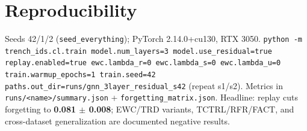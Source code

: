 \documentclass[10pt,a4paper,twocolumn]{article}
\begin{document}
\section{Reproducibility}
Seeds 42/1/2 (\texttt{seed\_everything}); PyTorch 2.14.0+cu130, RTX 3050. \texttt{python -m trench\_ids.cl.train model.num\_layers=3 model.use\_residual=true replay.enabled=true ewc.lambda\_r=0 ewc.lambda\_s=0 ewc.lambda\_u=0 train.warmup\_epochs=1 train.seed=42 paths.out\_dir=runs/gnn\_3layer\_residual\_s42} (repeat s1/s2). Metrics in \texttt{runs/\textless name\textgreater/summary.json} + \texttt{forgetting\_matrix.json}. Headline: replay cuts forgetting to \textbf{0.081 $\pm$ 0.008}; EWC/TRD variants, TCTRL/RFR/FACT, and cross-dataset generalization are documented negative results.
\end{document}
